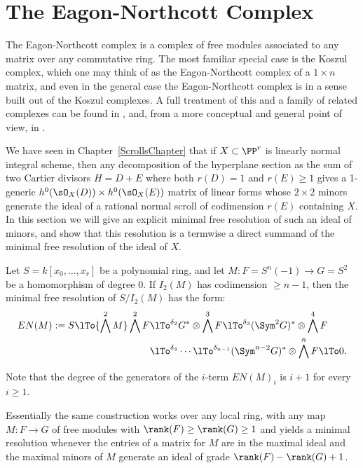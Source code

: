  
\section{The Eagon-Northcott Complex}\label{EN section}

The Eagon-Northcott complex is a complex of free modules associated to any matrix over any commutative ring. The most familiar special case is the Koszul complex, which one may think of as the Eagon-Northcott complex of a $1\times n$ matrix, and  even in the general case the Eagon-Northcott complex is in a sense built out of the Koszul complexes. A full treatment of this and a family of related complexes can be found in 
\cite[Appendix A2]{Eisenbud1995}, and, from a more conceptual and general point of view, in \cite{Weyman-book}. 

We have seen in Chapter~\ref{ScrollsChapter} that if $X\subset \PP^r$ is linearly normal integral scheme, then any decomposition
of the hyperplane section as the sum of two Cartier divisors
 $H = D+E$ where both $r(D) = 1$ and $r(E)\geq 1$ gives a 1-generic $h^0(\sO_X(D)) \times h^0(\sO_X(E))$
 matrix of linear forms whose $2\times 2$ minors generate the ideal of a rational normal scroll of codimension $r(E)$
 containing $X$. In this section we will give an explicit minimal free resolution of such an ideal of minors, and show that 
 this resolution is a termwise a direct summand of the
 minimal free resolution of the ideal of $X$.

\begin{theorem}\label{Eagon-Northcott}\label{E-N}
 Let $S = k[x_0,\dots, x_r]$ be a polynomial ring,  and let 
 $M: F = S^n(-1) \to G= S^2$ be a homomorphism of degree 0. If $I_2(M)$ has codimension $\geq n-1$, then the minimal free resolution of $S/I_2(M)$ has the form:
\begin{align*}
EN(M) := 
S \lTo{\bigwedge^2 M} 
 \bigwedge^2 F&
 \lTo^{\delta_{2}}
 G^*\otimes \bigwedge^3 F  \lTo^{\delta_{3}}
  (\Sym^2G)^*\otimes\bigwedge^4F  \\
 &\lTo^{\delta_{4}}\cdots\lTo^{\delta_{n-1}} 
(\Sym^{n-2}G)^*\otimes\bigwedge^nF 
 \lTo 0.
\end{align*}
\end{theorem}

Note that the degree of the generators of the $i$-term $EN(M)_i$ is $i+1$ for every $i\geq 1$.

Essentially the same construction works over any local ring, with any map $M: F\to G$ of free modules
with $\rank(F) \geq \rank(G) \geq 1$
and yields a minimal resolution whenever the entries of a matrix for $M$ are in the maximal
ideal and the maximal minors of $M$ generate an ideal of grade $\rank(F) - \rank(G)+1$.

